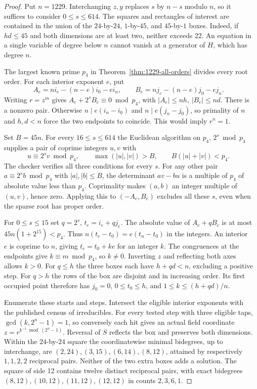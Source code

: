 \documentclass[11pt]{article}
\begin{document}
\begin{proof}
Put \(n=1229\). Interchanging \(z,y\) replaces \(s\) by \(n-s\)
modulo \(n\), so it suffices to consider \(0\le s\le614\).
The squares and rectangles of interest are contained in the union
of the \(24\)-by-\(24\), \(1\)-by-\(45\), and \(45\)-by-\(1\) boxes.
Indeed, if \(hd\le45\) and both dimensions are at least two, neither
exceeds 22. An equation in a single variable of degree below \(n\)
cannot vanish at a generator of \(H\), which has degree \(n\).

The largest known prime \(p_4\) in Theorem~\ref{thm:1229-all-orders}
divides every root order. For each interior exponent \(e\), put
\[
 A_e=ni_e-(n-e)i_0-ei_n,\qquad
 B_e=nj_e-(n-e)j_0-ej_n.
\]
Writing \(r=z^m\) gives \(A_e+2^sB_e\equiv0\bmod p_4\), with
\(|A_e|\le nh,\ |B_e|\le nd\).
There is a nonzero pair. Otherwise \(n\mid e(i_n-i_0)\) and
\(n\mid e(j_n-j_0)\), so primality of \(n\) and \(h,d<n\) force
the two endpoints to coincide. This would imply \(r^n=1\).

Set \(B=45n\). For every \(16\le s\le614\) the Euclidean algorithm on
\(p_4,\,2^s\bmod p_4\) supplies a pair of coprime integers \(u,v\)
with
\[
 u\equiv 2^s v\bmod p_4,\qquad
 \max(|u|,|v|)>B,\qquad B(|u|+|v|)<p_4.
\]
The checker verifies all three conditions for every \(s\).
For any other pair \(a\equiv 2^s b\bmod p_4\) with \(|a|,|b|\le B\),
the determinant \(av-bu\) is a multiple of \(p_4\) of absolute value
less than \(p_4\). Coprimality makes \((a,b)\) an integer multiple of
\((u,v)\), hence zero. Applying this to \((-A_e,B_e)\) excludes all
these \(s\), even when the sparse root has proper order.

For \(0\le s\le15\) set \(q=2^s\), \(t_e=i_e+qj_e\).
The absolute value of \(A_e+qB_e\) is at most \(45n(1+2^{15})<p_4\).
Thus \(n(t_e-t_0)=e(t_n-t_0)\) in the integers. An interior \(e\)
is coprime to \(n\), giving \(t_e=t_0+ke\) for an integer \(k\).
The congruences at the endpoints give \(k\equiv m\bmod p_4\), so
\(k\ne0\). Inverting \(z\) and reflecting both axes allows \(k>0\).
For \(q\le h\) the three boxes each have \(h+qd<n\), excluding a
positive step. For \(q>h\) the rows of the box are disjoint and
in increasing order. Its first occupied point therefore has
\(j_0=0\), \(0\le t_0\le h\), and \(1\le k\le(h+qd)/n\).

Enumerate these starts and steps. Intersect the eligible interior
exponents with the published census of irreducibles. For every tested
step with three eligible taps, \(\gcd(k,2^n-1)=1\), so conversely
each hit gives an actual field coordinate \(z=r^{k^{-1}\bmod(2^n-1)}\).
Reversal of \(S\) reflects the box and preserves both dimensions.
Within the \(24\)-by-\(24\) square the coordinatewise minimal bidegrees,
up to interchange, are \((2,24),(3,15),(6,14),(8,12)\), attained by
respectively \(1,1,2,2\) reciprocal pairs. Neither of the two extra
boxes adds a solution. The square of side 12 contains twelve distinct
reciprocal pairs, with exact bidegrees \((8,12),(10,12),(11,12),(12,12)\)
in counts \(2,3,6,1\).


\end{proof}
\end{document}
